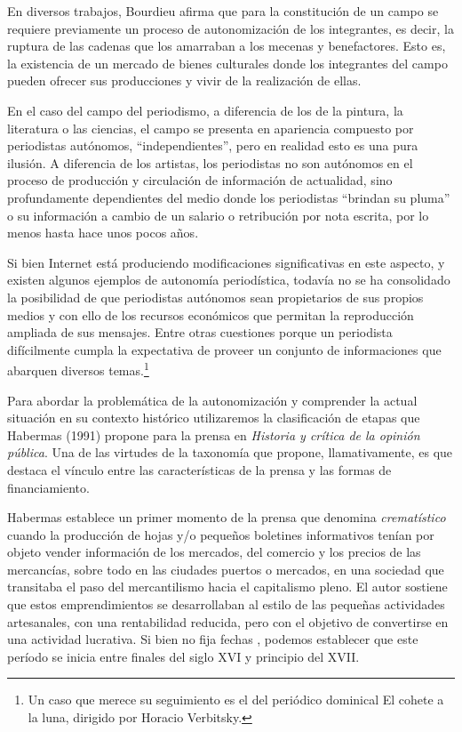En diversos trabajos, Bourdieu afirma que para la constitución de un campo se requiere previamente un proceso de autonomización de los integrantes, es decir, la ruptura de las cadenas que los amarraban a los mecenas y benefactores. Esto es, la existencia de un mercado de bienes culturales donde los integrantes del campo pueden ofrecer sus producciones y vivir de la realización de ellas.

En el caso del campo del periodismo, a diferencia de los de la pintura, la literatura o las ciencias, el campo se presenta en apariencia compuesto por periodistas autónomos, ``independientes'', pero en realidad esto es una pura ilusión. A diferencia de los artistas, los periodistas no son autónomos en el proceso de producción y circulación de información de actualidad, sino profundamente dependientes del medio donde los periodistas ``brindan su pluma'' o su información a cambio de un salario o retribución por nota escrita, por lo menos hasta hace unos pocos años.

Si bien Internet está produciendo modificaciones significativas en este aspecto, y existen algunos ejemplos de autonomía periodística, todavía no se ha consolidado la posibilidad de que periodistas autónomos sean propietarios de sus propios medios y con ello de los recursos económicos que permitan la reproducción ampliada de sus mensajes. Entre otras cuestiones porque un periodista difícilmente cumpla la expectativa de proveer un conjunto de informaciones que abarquen diversos temas.\footnote{Un caso que merece su seguimiento es el del periódico dominical El cohete a la luna, dirigido por Horacio Verbitsky.}

Para abordar la problemática de la autonomización y comprender la actual situación en su contexto histórico utilizaremos la clasificación de etapas que Habermas (1991) propone para la prensa en \emph{Historia y crítica de la opinión pública}. Una de las virtudes de la taxonomía que propone, llamativamente, es que destaca el vínculo entre las características de la prensa y las formas de financiamiento.

Habermas establece un primer momento de la prensa que denomina \emph{crematístico} cuando la producción de hojas y/o pequeños boletines informativos tenían por objeto vender información de los mercados, del comercio y los precios de las mercancías, sobre todo en las ciudades puertos o mercados, en una sociedad que transitaba el paso del mercantilismo hacia el capitalismo pleno. El autor sostiene que estos emprendimientos se desarrollaban al estilo de las pequeñas actividades artesanales, con una rentabilidad reducida, pero con el objetivo de convertirse en una actividad lucrativa. Si bien no fija fechas , podemos establecer que este período se inicia entre finales del siglo XVI y principio del XVII.

